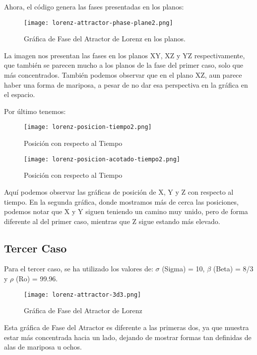 \documentclass[a4paper]{article}
\begin{document}
Ahora, el código genera las fases presentadas en los planos:
\begin{figure}[h!]
  \centering
  \texttt{[image: lorenz-attractor-phase-plane2.png]}
   \caption{Gráfica de Fase del Atractor de Lorenz en los planos.}
\end{figure}

La imagen nos presentan las fases en los planos XY, XZ y YZ respectivamente, que también se parecen mucho a los planos de la fase del primer caso, solo que más concentrados. También podemos observar que en el plano XZ, aun parece haber una forma de mariposa, a pesar de no dar esa perspectiva en la gráfica en el espacio. 

Por último tenemos:

\begin{figure}[ht!]
  \centering
  \texttt{[image: lorenz-posicion-tiempo2.png]}
   \caption{Posición con respecto al Tiempo}
\end{figure}

\begin{figure}[ht!]
  \centering
  \texttt{[image: lorenz-posicion-acotado-tiempo2.png]}
  \caption{Posición con respecto al Tiempo}
\end{figure}

Aquí podemos observar las gráficas de posición de X, Y y Z con respecto al tiempo. En la segunda gráfica, donde mostramos más de cerca las posiciones, podemos notar que X y Y siguen teniendo un camino muy unido, pero de forma diferente al del primer caso, mientras que Z sigue estando más elevado.

\pagebreak

\subsection{Tercer Caso}
Para el tercer caso, se ha utilizado los valores de:
$\sigma$ (Sigma) = 10, $\beta$ (Beta) = 8/3 y $\rho$ (Ro) = 99.96. 

\begin{figure}[h!]
  \centering
  \texttt{[image: lorenz-attractor-3d3.png]}
   \caption{Gráfica de Fase del Atractor de Lorenz}
\end{figure}

Esta gráfica de Fase del Atractor es diferente a las primeras dos, ya que muestra estar más concentrada hacia un lado, dejando de mostrar formas tan definidas de alas de mariposa u ochos.  
\end{document}
